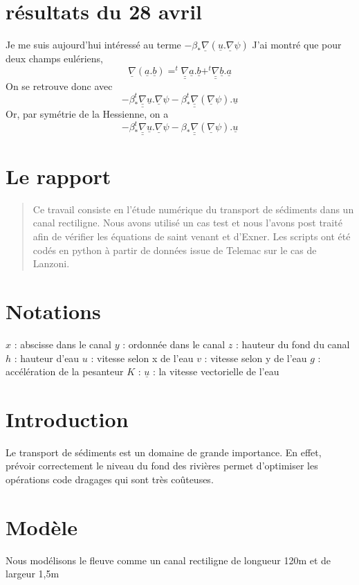 \documentclass[a4paper,10pt]{article}
\begin{document}
  \section{résultats du 28 avril}
  Je me suis aujourd'hui intéressé au terme $-\beta_*\underline{\nabla}(\underline{u}.\underline{\nabla}\psi)$
  J'ai montré que pour deux champs eulériens,
  \[\underline\nabla(\underline a.\underline b)=^t\underline{\underline\nabla}\underline a.\underline b+^t\underline{\underline\nabla}\underline b.\underline a\]
  On se retrouve donc avec
  \[-\beta_*^t\underline{\underline\nabla}\underline u.\underline\nabla \psi-\beta_*^t\underline{\underline\nabla}(\underline\nabla \psi).\underline u\]
  Or, par symétrie de la Hessienne, on a
  \[-\beta_*^t\underline{\underline\nabla}\underline u.\underline\nabla \psi-\beta_*\underline{\underline\nabla}(\underline\nabla \psi).\underline u\]
  \section{Le rapport}
  \begin{abstract}
   Ce travail consiste en l'étude numérique du transport de sédiments dans un canal rectiligne. Nous avons utilisé un cas test et nous
   l'avons post traité afin de vérifier les équations de saint venant et d'Exner. Les scripts ont été codés en python à partir de
   données issue de Telemac sur le cas de Lanzoni.
  \end{abstract}
  \section{Notations}
  $x$ : abscisse dans le canal
  $y$ : ordonnée dans le canal
  $z$ : hauteur du fond du canal
  $h$ : hauteur d'eau
  $u$ : vitesse selon x de l'eau
  $v$ : vitesse selon y de l'eau
  $g$ : accélération de la pesanteur
  $K$ : 
  $\underline u$ : la vitesse vectorielle de l'eau
  \section{Introduction}
  Le transport de sédiments est un domaine de grande importance. En effet, prévoir correctement le niveau du fond des rivières permet
  d'optimiser les opérations code dragages qui sont très coûteuses.
  
  \section{Modèle}
  Nous modélisons le fleuve comme un canal rectiligne de longueur 120m et de largeur 1,5m
  
\end{document}
